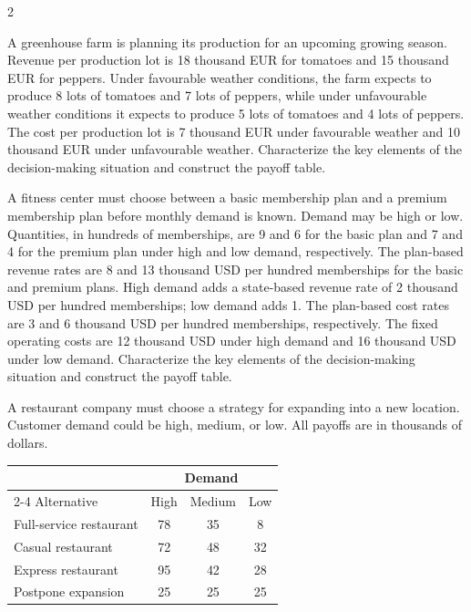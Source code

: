 \begin{multicols}{2}
		\columnbreak
		
		
		A greenhouse farm is planning its production for an upcoming growing season. Revenue per production lot is 18 thousand EUR for tomatoes and 15 thousand EUR for peppers. Under favourable weather conditions, the farm expects to produce 8 lots of tomatoes and 7 lots of peppers, while under unfavourable weather conditions it expects to produce 5 lots of tomatoes and 4 lots of peppers. The cost per production lot is 7 thousand EUR under favourable weather and 10 thousand EUR under unfavourable weather. Characterize the key elements of the decision-making situation and construct the payoff table.
		
		
		
		A fitness center must choose between a basic membership plan and a premium membership plan before monthly demand is known. Demand may be high or low. Quantities, in hundreds of memberships, are 9 and 6 for the basic plan and 7 and 4 for the premium plan under high and low demand, respectively. The plan-based revenue rates are 8 and 13 thousand USD per hundred memberships for the basic and premium plans. High demand adds a state-based revenue rate of 2 thousand USD per hundred memberships; low demand adds 1. The plan-based cost rates are 3 and 6 thousand USD per hundred memberships, respectively. The fixed operating costs are 12 thousand USD under high demand and 16 thousand USD under low demand. Characterize the key elements of the decision-making situation and construct the payoff table. 
		
		
		\newpage
		
		A restaurant company must choose a strategy for expanding into a new location. Customer demand could be high, medium, or low. All payoffs are in thousands of dollars. 
		
		\begin{center}
			\renewcommand{\arraystretch}{1.3}
			\small
			\begin{tabular}{lccc}
				\toprule
				& \multicolumn{3}{c}{Demand} \\
				\cmidrule(lr){2-4}
				Alternative & High & Medium & Low \\
				\midrule
				Full-service restaurant & 78 & 35 & 8 \\
				Casual restaurant & 72 & 48 & 32 \\
				Express restaurant & 95 & 42 & 28 \\
				Postpone expansion & 25 & 25 & 25 \\
				\bottomrule
			\end{tabular}
		\end{center}
		

\end{multicols}

